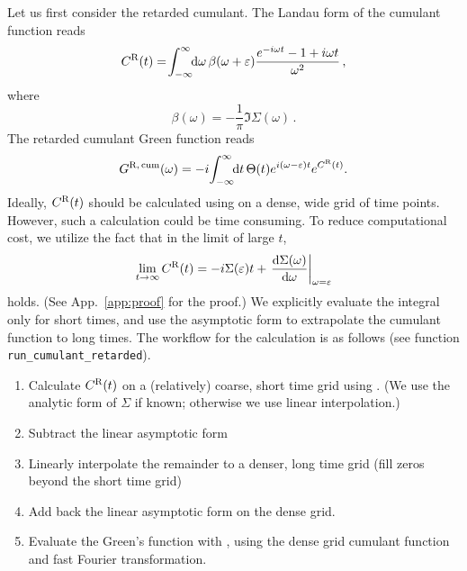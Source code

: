 \documentclass[
    reprint, onecolumn,
    aps,prx,11pt,tightenlines,amsmath,amssymb,
    longbibliography,superscriptaddress,citeautoscript,
    preprintnumbers,nofootinbib]{revtex4-2}
\begin{document}
Let us first consider the retarded cumulant.
%
The Landau form of the cumulant function reads~\cite{Loos2024Cumulant}
\begin{equation} \label{eq:C_R_t}
    C^{\rm R}(t) = \!\int_{-\infty}^{\infty}\!\! {\mathrm{d}}\omega \, \beta(\omega + \varepsilon) \frac{e^{-i\omega t} - 1 + i\omega t}{\omega^2} \,,
\end{equation}
where
\begin{equation} \label{eq:beta_def}
    \beta(\omega) = - \frac{1}{\pi} \Im \Sigma(\omega) \,.
\end{equation}
%
The retarded cumulant Green function reads
\begin{equation} \label{eq:G_R_cum}
    G^{\rm R,\,cum}(\omega)
    = -i \!\int_{-\infty}^{\infty}\!\! {\mathrm{d}} t\, \Theta(t) e^{i(\omega - \varepsilon) t} e^{C^{\rm R}(t)}.
\end{equation}
%
Ideally, $C^{\rm R}(t)$ should be calculated using  on a dense, wide grid of time points.
%
However, such a calculation could be time consuming.
%
To reduce computational cost, we utilize the fact that in the limit of large $t$,
\begin{equation} \label{eq:C_R_limit}
    \lim_{t \to \infty} C^{\rm R}(t) = -i \Sigma(\varepsilon) t + \left. \frac{{\mathrm{d}} \Sigma(\omega)}{{\mathrm{d}} \omega} \right|_{\omega = \varepsilon}
\end{equation}
holds.
(See App.~\ref{app:proof} for the proof.)
%
We explicitly evaluate the integral  only for short times, and use the asymptotic form  to extrapolate the cumulant function to long times.
%
The workflow for the calculation is as follows (see function \texttt{run\_cumulant\_retarded}).
\begin{enumerate}[topsep=0pt,itemsep=-1ex]
    \item Calculate $C^{\rm R}(t)$ on a (relatively) coarse, short time grid using . (We use the analytic form of $\Sigma$ if known; otherwise we use linear interpolation.)
    \item Subtract the linear asymptotic form 
    \item Linearly interpolate the remainder to a denser, long time grid (fill zeros beyond the short time grid)
    \item Add back the linear asymptotic form  on the dense grid.
    \item Evaluate the Green's function with , using the dense grid cumulant function and fast Fourier transformation.
\end{enumerate}
\end{document}
